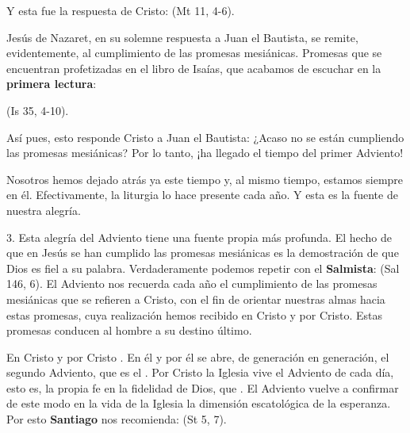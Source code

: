 \begin{body}
\begin{body}
Y esta fue la respuesta de Cristo:  (Mt 11, 4-6).

Jesús de Nazaret, en su solemne respuesta a Juan el Bautista, se remite, evidentemente, al cumplimiento de las promesas mesiánicas. Promesas que se encuentran profetizadas en el libro de Isaías, que acabamos de escuchar en la \textbf{primera lectura}:

 (Is 35, 4-10).

Así pues, esto responde Cristo a Juan el Bautista: ¿Acaso no se están cumpliendo las promesas mesiánicas? Por lo tanto, ¡ha llegado el tiempo del primer Adviento!

Nosotros hemos dejado atrás ya este tiempo y, al mismo tiempo, estamos siempre en él. Efectivamente, la liturgia lo hace presente cada año. Y esta es la fuente de nuestra alegría.

3. Esta alegría del Adviento tiene una fuente propia más profunda. El hecho de que en Jesús se han cumplido las promesas mesiánicas es la demostración de que Dios es fiel a su palabra. Verdaderamente podemos repetir con el \textbf{Salmista}:  (Sal 146, 6). El Adviento nos recuerda cada año el cumplimiento de las promesas mesiánicas que se refieren a Cristo, con el fin de orientar nuestras almas hacia estas promesas, cuya realización hemos recibido en Cristo y por Cristo. Estas promesas conducen al hombre a su destino último.

En Cristo y por Cristo . En él y por él se abre, de generación en generación, el segundo Adviento, que es el . Por Cristo la Iglesia vive el Adviento de cada día, esto es, la propia fe en la fidelidad de Dios, que . El Adviento vuelve a confirmar de este modo en la vida de la Iglesia la dimensión escatológica de la esperanza. Por esto \textbf{Santiago} nos recomienda:  (St 5, 7).


\end{body}
\end{body}

